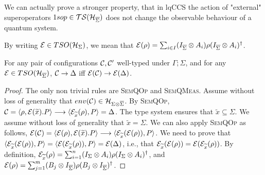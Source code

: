 We can actually prove a stronger property, that in lqCCS the action of "external" superoperators $1sop \in \mathcal{TS}(\mathcal{H}_{\overline{\Sigma}})$ does not change the observable behaviour of a quantum system.

By writing $\mathcal{E} \in TSO(\mathcal{H}_{\Sigma})$, we mean that $\mathcal{E}(\rho) = \sum_{i \in I} (I_{\overline{\Sigma}} \otimes A_i) \rho (I_{\overline{\Sigma}} \otimes A_i)^{\dagger}$.

\begin{lemma}\label{lemma:sop}
	For any pair of configurations $\mathcal{C}, \mathcal{C}'$ well-typed under $\Gamma; \Sigma$, and for any $\mathcal{E} \in TSO(\mathcal{H}_{\overline{\Sigma}})$,
	$\mathcal{C} \rightarrow \Delta$ iff $\mathcal{E}(\mathcal{C}) \rightarrow \mathcal{E}(\Delta)$.
\end{lemma}
\begin{proof}
	The only non trivial rules are {\scshape SemQOp} and {\scshape SemQMeas}.
	Assume without loss of generality that $env(\mathcal{C}) \in \mathcal{H}_{\Sigma \otimes \overline{\Sigma}}$.
	By {\scshape SemQOp}, $\mathcal{C} = \langle \rho, \mathcal{E}(\widetilde{x}) . P \rangle \longrightarrow \langle \mathcal{E}_{\widetilde{x}}(\rho), P \rangle = \Delta$.
	The type system ensures that $\tilde{x} \subseteq \Sigma$.
	We assume without loss of generality that $\tilde{x} = \Sigma$.
	We can also apply {\scshape SemQOp} as follows, $\mathcal{E}(\mathcal{C}) = \langle \mathcal{E}(\rho), \mathcal{E}(\widetilde{x}) . P \rangle  \longrightarrow \langle \mathcal{E}_{\widetilde{x}}(\mathcal{E}(\rho)), P \rangle$.
	We need to prove that $\langle \mathcal{E}_{\widetilde{x}}(\mathcal{E}(\rho)), P \rangle = \langle \mathcal{E}(\mathcal{E}_{\widetilde{x}}(\rho)), P \rangle = \mathcal{E}(\Delta)$, i.e., that $\mathcal{E}_{\widetilde{x}}(\mathcal{E}(\rho)) = \mathcal{E}(\mathcal{E}_{\widetilde{x}}(\rho))$.
	By definition, $\mathcal{E}_{\widetilde{x}}(\rho) = \sum_{i = 1}^{n} (I_{\Sigma} \otimes A_i) \rho (I_{\Sigma} \otimes A_i)^{\dagger}$, and $\mathcal{E}(\rho) = \sum_{j = 1}^{m} (B_j \otimes I_{\overline{\Sigma}}) \rho (B_j \otimes I_{\overline{\Sigma}})^{\dagger}$.


\end{proof}
